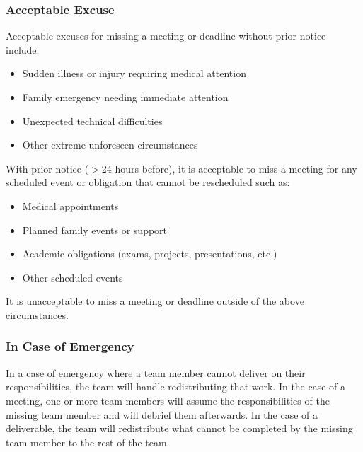 \documentclass{article}
\begin{document}
\subsubsection*{Acceptable Excuse}


\noindent Acceptable excuses for missing a meeting or deadline without prior notice include:
\begin{itemize}
  \item Sudden illness or injury requiring medical attention
  \item Family emergency needing immediate attention
  \item Unexpected technical difficulties
  \item Other extreme unforeseen circumstances
\end{itemize}

\noindent With prior notice ($>$24 hours before), it is acceptable to miss a meeting for any scheduled event or obligation that cannot be rescheduled such as:
\begin{itemize}
  \item Medical appointments
  \item Planned family events or support
  \item Academic obligations (exams, projects, presentations, etc.)
  \item Other scheduled events
\end{itemize}

\noindent It is unacceptable to miss a meeting or deadline outside of the above circumstances.

\subsubsection*{In Case of Emergency}


\noindent In a case of emergency where a team member cannot deliver on their responsibilities, the team will handle redistributing that work.
In the case of a meeting, one or more team members will assume the responsibilities of the missing team member and will debrief them afterwards.
In the case of a deliverable, the team will redistribute what cannot be completed by the missing team member to the rest of the team.
\end{document}

